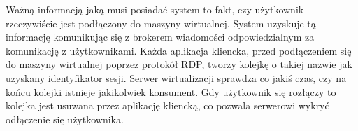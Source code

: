 \documentclass[../opis-rozwiazania.tex]{subfiles}
\begin{document}
\label{communication:user-broker}

Ważną informacją jaką musi posiadać system to fakt, czy użytkownik rzeczywiście jest podłączony do maszyny wirtualnej.
System uzyskuje tą informację komunikując się z brokerem wiadomości odpowiedzialnym za komunikację z użytkownikami.
Każda aplikacja kliencka, przed podłączeniem się do maszyny wirtualnej poprzez protokół RDP, tworzy kolejkę o takiej nazwie jak uzyskany identyfikator sesji.
Serwer wirtualizacji sprawdza co jakiś czas, czy na końcu kolejki istnieje jakikolwiek konsument.
Gdy użytkownik się rozłączy to kolejka jest usuwana przez aplikację kliencką, co pozwala serwerowi wykryć odłączenie się użytkownika.
\end{document}
